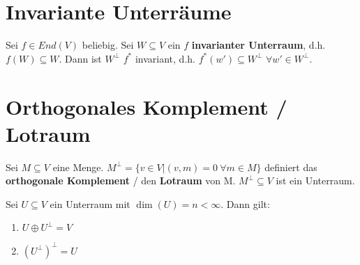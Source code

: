 \section{Invariante Unterräume}
\begin{theorem}
Sei $f \in End(V)$ beliebig. Sei $W \subseteq V$ ein $f$ \textbf{invarianter Unterraum}, d.h. $f(W) \subseteq W$. Dann ist $W^\perp$ $f^*$ invariant, d.h. $f^*(w') \subseteq W^\perp$ $\forall w' \in W^\perp$.
\end{theorem}

\section{Orthogonales Komplement / Lotraum}
\begin{theorem}
Sei $M \subseteq V$ eine Menge. $M^\perp = \{v\in V | (v,m)=0~\forall m \in M\}$ definiert das \textbf{orthogonale Komplement} / den \textbf{Lotraum} von M. $M^\perp \subseteq V$ ist ein Unterraum.

Sei $U \subseteq V$ ein Unterraum mit $\dim(U) = n < \infty$. Dann gilt:
\begin{enumerate}
	\item $U \oplus U^\perp = V$
	\item $(U^\perp)^\perp = U$
\end{enumerate}
\end{theorem}
